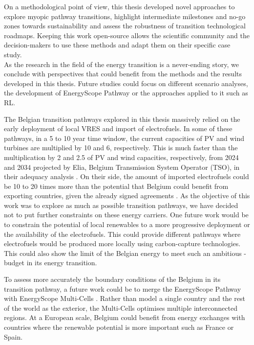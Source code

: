 On a methodological point of view, this thesis developed novel approaches to explore myopic pathway transitions, highlight intermediate milestones and no-go zones towards sustainability and assess the robustness of transition technological roadmaps. Keeping this work open-source allows the scientific community and the decision-makers to use these methods and adapt them on their specific case study. \\


As the research in the field of the energy transition is a never-ending story, we conclude with perspectives that could benefit from the methods and the results developed in this thesis.  Future studies could focus on different scenario analyses, the development of EnergyScope Pathway or the approaches applied to it such as \gls{RL}. 

The Belgian transition pathways explored in this thesis massively relied on the early deployment of local \gls{VRES} and import of electrofuels. In some of these pathways, in a 5 to 10 year time window, the current capacities of \gls{PV} and wind turbines are multiplied by 10 and 6, respectively. This is much faster than the multiplication by 2 and 2.5 of PV and wind capacities, respectively, from 2024 and 2034 projected by Elia, Belgium Transmission System Operator (TSO),  in their adequacy analysis \cite{Elia_2024_2034}. On their side, the amount of imported electrofuels could be 10 to 20 times more than the potential that Belgium could benefit from exporting countries, given the already signed agreements \cite{lefebvre2022electrofuel}. As the objective of this work was to explore as much as possible transition pathways, we have decided not to put further constraints on these energy carriers. One future work would be to constrain the potential of local renewables to a more progressive deployment or the availability of the electrofuels. This could provide different pathways where electrofuels would be produced more locally using carbon-capture technologies. This could also show the limit of the Belgian energy to meet such an ambitious -budget in its energy transition. 

To assess more accurately the boundary conditions of the Belgium in its transition pathway, a future work could be to merge the EnergyScope Pathway with EnergyScope Multi-Cells \cite{thiran2023validation}. Rather than model a single country and the rest of the world as the exterior, the Multi-Cells optimises multiple interconnected regions. At a European scale, Belgium could benefit from energy exchanges with countries where the renewable potential is more important such as France or Spain. 

